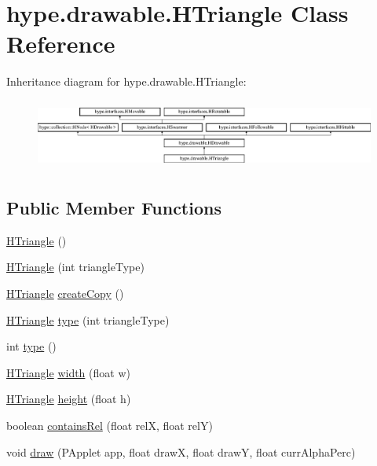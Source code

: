 \hypertarget{classhype_1_1drawable_1_1_h_triangle}{\section{hype.\-drawable.\-H\-Triangle Class Reference}
\label{classhype_1_1drawable_1_1_h_triangle}
}
Inheritance diagram for hype.\-drawable.\-H\-Triangle\-:\begin{figure}[H]
\begin{center}
\leavevmode
\includegraphics[height=2.333333cm]{classhype_1_1drawable_1_1_h_triangle}
\end{center}
\end{figure}
\subsection*{Public Member Functions}
\begin{DoxyCompactItemize}
\item 
\hyperlink{classhype_1_1drawable_1_1_h_triangle_a15e572f5bafff41ea3e9801bc37ceef7}{H\-Triangle} ()
\item 
\hyperlink{classhype_1_1drawable_1_1_h_triangle_a0e5576354aaccf97051418b6da7a5a79}{H\-Triangle} (int triangle\-Type)
\item 
\hyperlink{classhype_1_1drawable_1_1_h_triangle}{H\-Triangle} \hyperlink{classhype_1_1drawable_1_1_h_triangle_ac763efc21e2afa736061d6c81cd17b01}{create\-Copy} ()
\item 
\hyperlink{classhype_1_1drawable_1_1_h_triangle}{H\-Triangle} \hyperlink{classhype_1_1drawable_1_1_h_triangle_a86711aba96084441555366d8c6a9f2ea}{type} (int triangle\-Type)
\item 
int \hyperlink{classhype_1_1drawable_1_1_h_triangle_a03240695901d571ff13d807fe19107c6}{type} ()
\item 
\hyperlink{classhype_1_1drawable_1_1_h_triangle}{H\-Triangle} \hyperlink{classhype_1_1drawable_1_1_h_triangle_a68b40ad4eab9703328d766adbf88f1ee}{width} (float w)
\item 
\hyperlink{classhype_1_1drawable_1_1_h_triangle}{H\-Triangle} \hyperlink{classhype_1_1drawable_1_1_h_triangle_adafd6c5d5c2420f4bbce6a61f291b22f}{height} (float h)
\item 
boolean \hyperlink{classhype_1_1drawable_1_1_h_triangle_ad0e27196dc649e4533d3a6ea5a2cc05d}{contains\-Rel} (float rel\-X, float rel\-Y)
\item 
void \hyperlink{classhype_1_1drawable_1_1_h_triangle_a0f334c5c07aef482ae39964e36642552}{draw} (P\-Applet app, float draw\-X, float draw\-Y, float curr\-Alpha\-Perc)
\end{DoxyCompactItemize}
